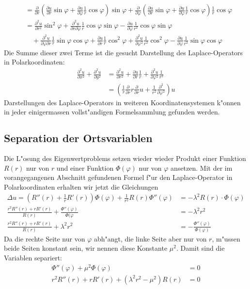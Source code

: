 \begin{align*}
&=
\frac{\partial}{\partial r}
\left(
\frac{\partial u}{\partial r}
\sin\varphi
+
\frac{\partial u}{\partial\varphi}
\frac1r\cos\varphi
\right)
\sin\varphi
+
\frac{\partial}{\partial \varphi}
\left(
\frac{\partial u}{\partial r}
\sin\varphi
+
\frac{\partial u}{\partial\varphi}
\frac1r\cos\varphi
\right)
\frac1r\cos\varphi
\\
&=
\frac{\partial^2u}{\partial r^2}\sin^2\varphi
+\frac{\partial^2u}{\partial r\partial\varphi}\frac1r\cos\varphi\sin\varphi
-\frac{\partial u}{\partial\varphi}\frac1{r^2}\cos\varphi\sin\varphi
\\
&\quad
+
\frac{\partial^2u}{\partial\varphi\partial r}\frac1r\sin\varphi\cos\varphi
+\frac{\partial u}{\partial r}\frac1r\cos^2\varphi
+\frac{\partial^2u}{\partial \varphi^2}\frac1{r^2}\cos^2\varphi
-\frac{\partial u}{\partial \varphi}\frac1{r^2}\sin\varphi\cos\varphi
\end{align*}
Die Summe dieser zwei Terme ist die gesucht Darstellung des Laplace-Operators
in Polarkoordinaten:
\begin{align*}
\frac{\partial^2u}{\partial x^2}+\frac{\partial^2u}{\partial y^2}
&=
\frac{\partial^2u}{\partial r^2}
+\frac{\partial u}{\partial r}\frac1r
+\frac{\partial^2u}{\partial\varphi^2}\frac1{r^2}
\\
&=
\left(\frac1r\frac{\partial}{\partial r}r\frac{\partial}{\partial r}u+\frac1{r^2}\frac{\partial^2}{\partial \varphi^2}\right)u
\end{align*}
Darstellungen des Laplace-Operators in weiteren Koordinatensystemen k"onnen
in jeder einigermassen vollst"andigen Formelsammlung gefunden werden.

\subsection{Separation der Ortsvariablen}
Die L"osung des Eigenwertproblems setzen wieder wieder Produkt einer Funktion
$R(r)$
nur von  $r$ und einer Funktion $\Phi(\varphi)$ nur von $\varphi$
ansetzen.
Mit der im vorangegangenen Abschnitt gefundenen Formel f"ur den Laplace-Operator
in Polarkoordinaten erhalten wir jetzt die Gleichungen
\begin{align*}
\Delta u=
\left(R''(r) + \frac1rR'(r)\right)\Phi(\varphi)
+\frac1{r^2}R(r)\Phi''(\varphi)&=-\lambda^2 R(r)\cdot\Phi(\varphi)\\
\frac{r^2R''(r)+rR'(r)}{R(r)}+\frac{\Phi''(\varphi)}{\Phi(\varphi}
&=-\lambda^2 r^2
\\
\frac{r^2R''(r)+rR'(r)}{R(r)}+\lambda^2 r^2&=-\frac{\Phi''(\varphi)}{\Phi(\varphi)}
\end{align*}
Da die rechte Seite nur von $\varphi$ abh"angt, die linke Seite aber nur von $r$,
m"ussen beide Seiten konstant sein, wir nennen diese Konstante $\mu^2$.
Damit sind die Variablen separiert:
\begin{align}
\Phi''(\varphi)+\mu^2\Phi(\varphi)&=0\label{phigleichung}\\
r^2R''(r)+rR'(r)+(\lambda^2 r^2-\mu^2)R(r)&=0\label{rgleichung}
\end{align}

